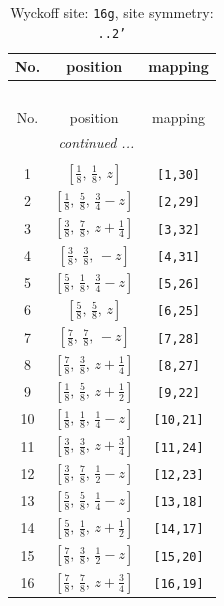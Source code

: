 \documentclass[fleqn,8pt]{jsarticle}
\begin{document}
\renewcommand{\arraystretch}{1.2}
\begin{longtable}{ccc}
\caption{Wyckoff site: {\tt 16g}, site symmetry: {\tt ..2'}}
 \\
 \hline \hline
No. & position & mapping \\ \hline \endfirsthead

\multicolumn{2}{l}{\tablename\ \thetable{}} \\
 \hline \hline
No. & position & mapping \\ \hline \endhead

 \hline \hline
\multicolumn{2}{r}{\footnotesize\it continued ...} \\ \endfoot

 \hline \hline
\multicolumn{2}{r}{} \\ \endlastfoot

1 & $\left[ \frac{1}{8},\, \frac{1}{8},\, z \right]$ & {\tt [1,30]} \\ \hline
2 & $\left[ \frac{1}{8},\, \frac{5}{8},\, \frac{3}{4} - z \right]$ & {\tt [2,29]} \\ \hline
3 & $\left[ \frac{3}{8},\, \frac{7}{8},\, z + \frac{1}{4} \right]$ & {\tt [3,32]} \\ \hline
4 & $\left[ \frac{3}{8},\, \frac{3}{8},\, - z \right]$ & {\tt [4,31]} \\ \hline
5 & $\left[ \frac{5}{8},\, \frac{1}{8},\, \frac{3}{4} - z \right]$ & {\tt [5,26]} \\ \hline
6 & $\left[ \frac{5}{8},\, \frac{5}{8},\, z \right]$ & {\tt [6,25]} \\ \hline
7 & $\left[ \frac{7}{8},\, \frac{7}{8},\, - z \right]$ & {\tt [7,28]} \\ \hline
8 & $\left[ \frac{7}{8},\, \frac{3}{8},\, z + \frac{1}{4} \right]$ & {\tt [8,27]} \\ \hline
9 & $\left[ \frac{1}{8},\, \frac{5}{8},\, z + \frac{1}{2} \right]$ & {\tt [9,22]} \\ \hline
10 & $\left[ \frac{1}{8},\, \frac{1}{8},\, \frac{1}{4} - z \right]$ & {\tt [10,21]} \\ \hline
11 & $\left[ \frac{3}{8},\, \frac{3}{8},\, z + \frac{3}{4} \right]$ & {\tt [11,24]} \\ \hline
12 & $\left[ \frac{3}{8},\, \frac{7}{8},\, \frac{1}{2} - z \right]$ & {\tt [12,23]} \\ \hline
13 & $\left[ \frac{5}{8},\, \frac{5}{8},\, \frac{1}{4} - z \right]$ & {\tt [13,18]} \\ \hline
14 & $\left[ \frac{5}{8},\, \frac{1}{8},\, z + \frac{1}{2} \right]$ & {\tt [14,17]} \\ \hline
15 & $\left[ \frac{7}{8},\, \frac{3}{8},\, \frac{1}{2} - z \right]$ & {\tt [15,20]} \\ \hline
16 & $\left[ \frac{7}{8},\, \frac{7}{8},\, z + \frac{3}{4} \right]$ & {\tt [16,19]} \\
\end{longtable}
\end{document}
